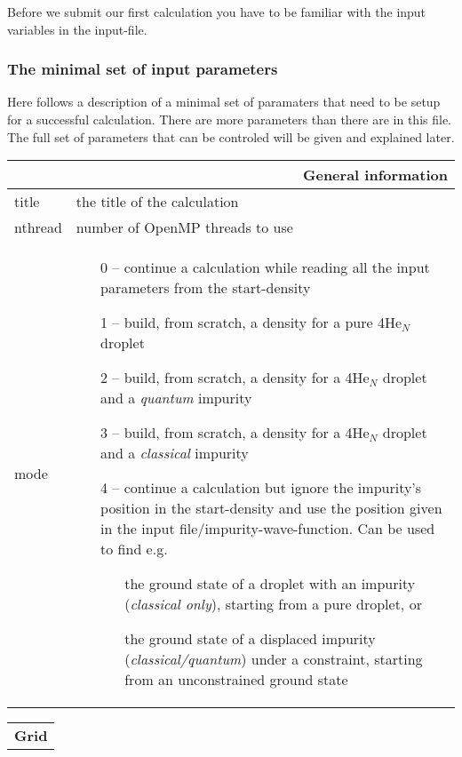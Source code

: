 \documentclass[10pt,a4paper]{article}
\begin{document}
	Before we submit our first calculation you have to be familiar with the input variables in the input-file.
	
	\subsubsection{The minimal set of input parameters}
	Here follows a description of a minimal set of paramaters that need to be setup for a successful calculation. There are more parameters than there are in this file. The full set of parameters that can be controled will be given and explained later.

	\begin{center}
	\begin{tabular}{l|p{9.6cm}}
		\multicolumn{2}{r}{\textbf{General information}} \\
		\hline\hline
		title		& the title of the calculation	\\
		\hline
		nthread		& number of OpenMP threads to use	\\
		\hline
		mode		& \begin{enumerate}
			\item[0 --] continue a calculation while reading all the input parameters from the start-density
			\item[1 --] build, from scratch, a density for a pure 4He$_N$ droplet
			\item[2 --] build, from scratch, a density for a 4He$_N$ droplet and a \emph{quantum} impurity
			\item[3 --] build, from scratch,  a density for a 4He$_N$ droplet and a \emph{classical} impurity
			\item[4 --] continue a calculation but ignore the impurity's position in the start-density and use the position given in the input file/impurity-wave-function. Can be used to find e.g.
			\begin{itemize}
				\item[\ding{105}] the ground state of a droplet with an impurity (\emph{classical only}), starting from a pure droplet, or 
				\item[\ding{105}] the ground state of a displaced impurity (\emph{classical/quantum}) under a constraint, starting from an unconstrained ground state
			\end{itemize}
		\end{enumerate}
	\end{tabular}
	\begin{tabular}{l|p{9.6cm}}
		\multicolumn{2}{r}{\textbf{Grid}}	\\

\end{tabular}
\end{center}
\end{document}
